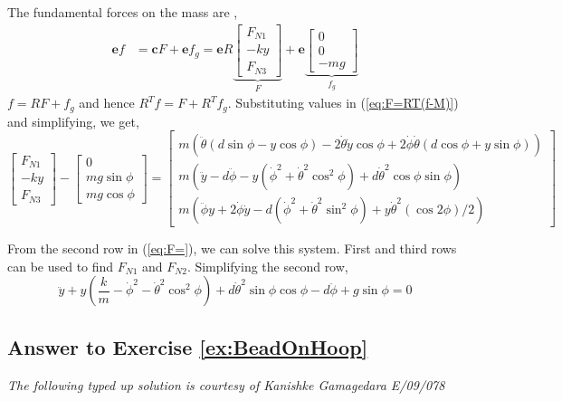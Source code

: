 \documentclass[graybox,envcountchap,sectrefs]{svmonoMuga}
\begin{document}
The fundamental forces on the mass are ,
\begin{align*}
\mathbf{e}f&=\mathbf{c}F+\mathbf{e}f_g=\mathbf{e}R\underbrace{\begin{bmatrix}
F_{N1}\\-ky\\F_{N3}
\end{bmatrix}}_{F}
+\mathbf{e}\underbrace{\begin{bmatrix}
0\\0\\-mg
\end{bmatrix}}_{f_g}
\end{align*}
$f=RF+f_g$ and hence $R^Tf=F+R^Tf_g$.
Substituting values in (\ref{eq:F=RT(f-M)}) and simplifying, we get,
\begin{equation}
\begin{bmatrix}
F_{N1}\\-ky\\F_{N3}
\end{bmatrix}-\begin{bmatrix}
0\\mg\sin{\phi}\\mg\cos{\phi}
\end{bmatrix}=
\begin{bmatrix}
m\left(\ddot{\theta}(d\sin\phi - y\cos\phi) - 2\dot{\theta}\dot{y}\cos\phi + 2\dot{\phi}\dot{\theta}(d\cos\phi + y\sin\phi)\right)\\
m\left(\ddot{y} - d\ddot{\phi}-y(\dot{\phi}^2 + \dot{\theta}^2\cos^2\phi) + d\dot{\theta}^2\cos\phi\sin\phi\right)\\
m\left(\ddot{\phi}y + 2\dot{\phi}\dot{y} - d(\dot{\phi}^2 +\dot{\theta}^2 \sin^2\phi) + y\dot{\theta}^2(\cos{2\phi})/2\right)
\end{bmatrix} \label{eq:F=}
\end{equation}

From the second row in (\ref{eq:F=}), we can solve this system. First and third rows can be used to find $F_{N1}$ and $F_{N2}$. Simplifying the second row,
\begin{equation}
\ddot{y}+y\left(\frac{k}{m}-\dot{\phi}^2-\dot{\theta}^2\cos^2\phi\right)+d\dot{\theta}^2\sin\phi\cos\phi-d\ddot{\phi}+g\sin\phi=0
\end{equation} 




\subsection*{Answer to Exercise \ref{ex:BeadOnHoop}}
{\it The following typed up solution is courtesy of Kanishke Gamagedara E/09/078}\\
\end{document}
